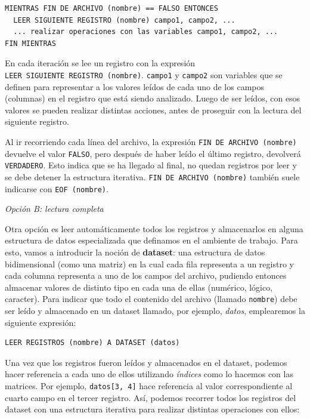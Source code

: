 \documentclass[
]{book}
\begin{document}
\begin{itemize}
\begin{verbatim}
MIENTRAS FIN DE ARCHIVO (nombre) == FALSO ENTONCES
  LEER SIGUIENTE REGISTRO (nombre) campo1, campo2, ...  
  ... realizar operaciones con las variables campo1, campo2, ...
FIN MIENTRAS
\end{verbatim}

  En cada iteración se lee un registro con la expresión \texttt{LEER\ SIGUIENTE\ REGISTRO\ (nombre)}. \texttt{campo1} y \texttt{campo2} son variables que se definen para representar a los valores leídos de cada uno de los campos (columnas) en el registro que está siendo analizado. Luego de ser leídos, con esos valores se pueden realizar distintas acciones, antes de proseguir con la lectura del siguiente registro.

  Al ir recorriendo cada línea del archivo, la expresión \texttt{FIN\ DE\ ARCHIVO\ (nombre)} devuelve el valor \texttt{FALSO}, pero después de haber leído el último registro, devolverá \texttt{VERDADERO}. Esto indica que se ha llegado al final, no quedan registros por leer y se debe detener la estructura iterativa. \texttt{FIN\ DE\ ARCHIVO\ (nombre)} también suele indicarse con \texttt{EOF\ (nombre)}.

  \emph{Opción B: lectura completa}

  Otra opción es leer automáticamente todos los registros y almacenarlos en alguna estructura de datos especializada que definamos en el ambiente de trabajo. Para esto, vamos a introducir la noción de \textbf{dataset}: una estructura de datos bidimensional (como una matriz) en la cual cada fila representa a un registro y cada columna representa a uno de los campos del archivo, pudiendo entonces almacenar valores de distinto tipo en cada una de ellas (numérico, lógico, caracter). Para indicar que todo el contenido del archivo (llamado \texttt{nombre}) debe ser leído y almacenado en un dataset llamado, por ejemplo, \emph{datos}, emplearemos la siguiente expresión:

\begin{verbatim}
LEER REGISTROS (nombre) A DATASET (datos)
\end{verbatim}

  Una vez que los registros fueron leídos y almacenados en el dataset, podemos hacer referencia a cada uno de ellos utilizando \emph{índices} como lo hacemos con las matrices. Por ejemplo, \texttt{datos{[}3,\ 4{]}} hace referencia al valor correspondiente al cuarto campo en el tercer registro. Así, podemos recorrer todos los registros del dataset con una estructura iterativa para realizar distintas operaciones con ellos:


\end{itemize}
\end{document}
